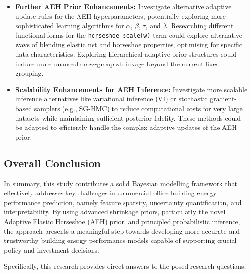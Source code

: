 \begin{itemize}
\item \textbf{Further AEH Prior Enhancements:} Investigate alternative adaptive update rules for the AEH hyperparameters, potentially exploring more sophisticated learning algorithms for $\alpha$, $\beta$, $\tau$, and $\lambda$. Researching different functional forms for the \texttt{horseshoe\_scale(w)} term could explore alternative ways of blending elastic net and horseshoe properties, optimising for specific data characteristics. Exploring hierarchical adaptive prior structures could induce more nuanced cross-group shrinkage beyond the current fixed grouping.

\item \textbf{Scalability Enhancements for AEH Inference:} Investigate more scalable inference alternatives like variational inference (VI) or stochastic gradient-based samplers (e.g., SG-HMC) to reduce computational costs for very large datasets while maintaining sufficient posterior fidelity. These methods could be adapted to efficiently handle the complex adaptive updates of the AEH prior.
\end{itemize}

\subsection{Overall Conclusion}

In summary, this study contributes a solid Bayesian modelling framework that effectively addresses key challenges in commercial office building energy performance prediction, namely feature sparsity, uncertainty quantification, and interpretability. By using advanced shrinkage priors, particularly the novel Adaptive Elastic Horseshoe (AEH) prior, and principled probabilistic inference, the approach presents a meaningful step towards developing more accurate and trustworthy building energy performance models capable of supporting crucial policy and investment decisions.

Specifically, this research provides direct answers to the posed research questions:

